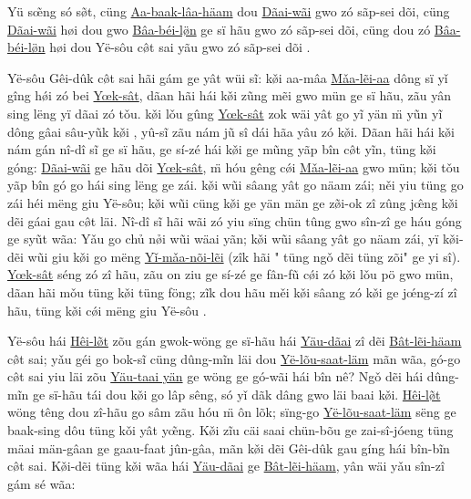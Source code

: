 \documentclass[twoside,twocolumn,a4paper,10pt]{memoir}
\begin{document}
\begin{scripture}
		Yü s\~{œ}ng só sø̃t, cüng \underline{Aa-baak-lâa-häam} dou \underline{Dãai-wãi} gwo zó sãp-sei dõi, cüng \underline{Dãai-wãi} høi dou gwo \underline{Bâa-béi-lø̈n} ge sï hãu gwo zó sãp-sei dõi, cüng dou zó \underline{Bâa-béi-lø̈n} høi dou Yë-sôu cø̂t sai yãu gwo zó sãp-sei dõi .
		
		Yë-sôu Gêi-dûk cø̂t sai hãi gám ge yât wüi sĩ: k\v{ø}i aa-mâa \underline{M\v{a}a-lẽi-aa} dông sï y\v{i} gîng hǿi zó bei \underline{Yœk-sât}, dãan hãi hái kø̌i zũng mẽi gwo mün ge sï hãu, zãu yân sing lëng yï dãai zó t\v{o}u.
		kø̌i l\v{o}u gûng \underline{Yœk-sât} zok wäi yât go yĩ yän m̈ yũn yĩ dông gâai sâu-yũk kø̌i , yû-sĩ zãu nám jũ sî dái hãa yâu zó kø̌i.
		Dãan hãi hái kø̌i nám gán nî-dî sĩ ge sï hãu,  ge sí-zé hái kø̌i ge mũng yãp bîn cø̂t yĩn, tüng kø̌i góng: \underline{Dãai-wãi} ge hãu dõi \underline{Yœk-sât}, m̈ hóu gêng cǿi \underline{M\v{a}a-lẽi-aa} gwo mün; kø̌i t\v{o}u yãp bîn gó go hái sing lëng ge zái.
		kø̌i wũi sâang yât go näam zái; n\v{e}i yiu tüng go zái héi mëng giu Yë-sôu; kø̌i wũi cüng kø̌i ge yän män ge zø̃i-ok zî zûng jœ̂ng kø̌i dẽi gáai gau cø̂t läi.
		Nî-dî sĩ hãi wãi zó yiu sïng chün  tûng gwo sîn-zî ge háu góng ge syũt wãa:
		Y\v{a}u go chủ nø̉i wũi wäai yãn; kø̌i wũi sâang yât go näam zái, yï kø̌i-dẽi wũi giu kø̌i go mëng \underline{Y\v{i}-m\v{a}a-nõi-lẽi} (zîk hãi " tüng ng\v{o} dẽi tüng zõi" ge yi sî).
		\underline{Yœk-sât} séng zó zî hãu, zãu on ziu  ge sí-zé ge fân-fũ cǿi zó kø̌i l\v{o}u pö gwo mün,
		dãan hãi m\v{o}u tüng kø̌i tüng föng; zĩk dou hãu m\v{e}i kø̌i sâang zó kø̌i ge jœ́ng-zí zî hãu, tüng kø̌i cǿi mëng giu Yë-sôu .
		
		
		
		\noindent
		Yë-sôu hái \underline{Hêi-l\~{\o{}}t} zõu gán gwok-wöng ge sï-hãu hái
		\underline{Yäu-dãai} zî dẽi \underline{Bât-lẽi-häam} c\^{\o{}}t sai; y\v{a}u géi go bok-sĩ
		cüng dûng-mĩn läi dou \underline{Yë-lõu-saat-läm} mãn wãa, gó-go c\^{\o{}}t sai yiu läi zõu \underline{Yäu-taai yän} ge wöng ge
		gó-wãi hái bîn nê? Ng\v{o} dẽi hái dûng-mĩn ge sï-hãu tái dou
		k\v{\o{}}i go lâp sêng, só y\v{i} dãk dâng gwo läi baai k\v{\o{}}i. \underline{Hêi-l\~{\o{}}t} wöng têng dou  zî-hãu go sâm zãu hóu
		\"{m} ôn lõk; sïng-go \underline{Yë-lõu-saat-läm} sëng ge baak-sing dôu tüng
		k\v{o}i yât y\~{œ}ng. K\v{\o{}}i zĩu cäi saai chün-bõu ge zai-sî-jóeng tüng mäai
		män-gâan ge gaau-faat jûn-gâa, mãn k\v{\o{}}i dẽi Gêi-dûk gau gíng
		hái bîn-bĩn c\^{\o{}}t sai. K\v{\o{}}i-dẽi tüng k\v{\o{}}i wãa hái \underline{Yäu-dãai} ge \underline{Bât-lẽi-häam}, yân wäi y\v{a}u sîn-zî gám sé wãa:
		

\end{scripture}
\end{document}
